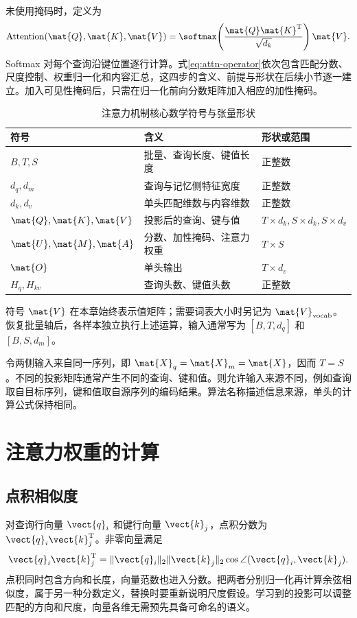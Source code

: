 \documentclass[../textbook.tex]{subfiles}
\begin{document}
未使用掩码时，定义为
\begin{equation}
 \operatorname{Attention}(\mat{Q},\mat{K},\mat{V})
 =\softmax\!\left(\frac{\mat{Q}\mat{K}^{\mathrm{T}}}{\sqrt{d_k}}\right)\mat{V}.
 \label{eq:attn-operator}
\end{equation}
Softmax 对每个查询沿键位置逐行计算。式\eqref{eq:attn-operator}依次包含匹配分数、尺度控制、权重归一化和内容汇总，这四步的含义、前提与形状在后续小节逐一建立。加入可见性掩码后，只需在归一化前向分数矩阵加入相应的加性掩码。

\begin{table}[htbp]
\centering
\caption{注意力机制核心数学符号与张量形状}\label{tab:attn-notations}
\begin{tabularx}{\linewidth}{p{24mm}Xp{26mm}}
\toprule
符号 & 含义 & 形状或范围\\\midrule
$B,T,S$ & 批量、查询长度、键值长度 & 正整数\\
$d_q,d_m$ & 查询与记忆侧特征宽度 & 正整数\\
$d_k,d_v$ & 单头匹配维数与内容维数 & 正整数\\
$\mat{Q},\mat{K},\mat{V}$ & 投影后的查询、键与值 & $T\times d_k,S\times d_k,S\times d_v$\\
$\mat{U},\mat{M},\mat{A}$ & 分数、加性掩码、注意力权重 & $T\times S$\\
$\mat{O}$ & 单头输出 & $T\times d_v$\\
$H_q,H_{kv}$ & 查询头数、键值头数 & 正整数\\
\bottomrule
\end{tabularx}
\end{table}
符号 $\mat{V}$ 在本章始终表示值矩阵；需要词表大小时另记为 $\mat{V}_{\mathrm{vocab}}$。恢复批量轴后，各样本独立执行上述运算，输入通常写为 $[B,T,d_q]$ 和 $[B,S,d_m]$。

令两侧输入来自同一序列，即 $\mat{X}_q=\mat{X}_m=\mat{X}$，因而 $T=S$。不同的投影矩阵通常产生不同的查询、键和值。则允许输入来源不同，例如查询取自目标序列，键和值取自源序列的编码结果。算法名称描述信息来源，单头的计算公式保持相同。

\section{注意力权重的计算}

\subsection{点积相似度}
对查询行向量 $\vect{q}_i$ 和键行向量 $\vect{k}_j$，点积分数为 $\vect{q}_i \vect{k}_j^{\mathrm{T}}$。非零向量满足
\begin{equation}
 \vect{q}_i \vect{k}_j^{\mathrm{T}}=\|\vect{q}_i\|_2\|\vect{k}_j\|_2\cos\angle(\vect{q}_i,\vect{k}_j).
\end{equation}
点积同时包含方向和长度，向量范数也进入分数。把两者分别归一化再计算余弦相似度，属于另一种分数定义，替换时要重新说明尺度假设。学习到的投影可以调整匹配的方向和尺度，向量各维无需预先具备可命名的语义。
\end{document}
